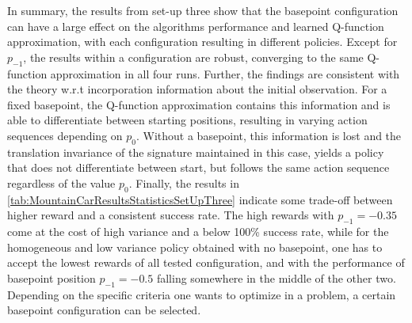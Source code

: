 \documentclass[
    a4paper,
    11pt,
    bibliography=totoc,
    listof=totoc,      
    headinclude=true,
    cleardoublepage=empty,
]{scrbook}
\theoremstyle{plain}
\theoremstyle{definition}
\theoremstyle{remark}
\begin{document}
In summary, the results from set-up three show that the basepoint
configuration can have a large effect on the algorithms performance and
learned Q-function approximation, with each configuration resulting in
different policies. Except for $p_{-1}$, the results within a configuration
are robust, converging to the same Q-function approximation in all four runs.
Further, the findings are consistent with the theory w.r.t incorporation
information about the initial observation. For a fixed basepoint, the 
Q-function approximation contains this information and is able to
differentiate between starting positions, resulting in varying action
sequences depending on $p_0$. Without a basepoint, this information is lost
and the translation invariance of the signature maintained in this case,
yields a policy that does not differentiate between start, but follows the
same action sequence regardless of the value $p_0$. Finally, the results in
\cref{tab:MountainCarResultsStatisticsSetUpThree} indicate some trade-off
between higher reward and a consistent success rate. The high rewards with
$p_{-1} =-0.35$ come at the cost of high variance and a below 100\% success 
rate, while for the homogeneous and low variance policy obtained with no 
basepoint, one has to accept the lowest rewards of all tested configuration,
and with the performance of basepoint position $p_{-1}=-0.5$ falling
somewhere in the middle of the other two. Depending on the specific criteria
one wants to optimize in a problem, a certain basepoint configuration can be
selected.
\end{document}
